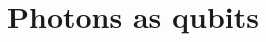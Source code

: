 \documentclass[aspectratio=169,9pt]{beamer}
\begin{document}



\section{Photons as qubits}
\end{document}
